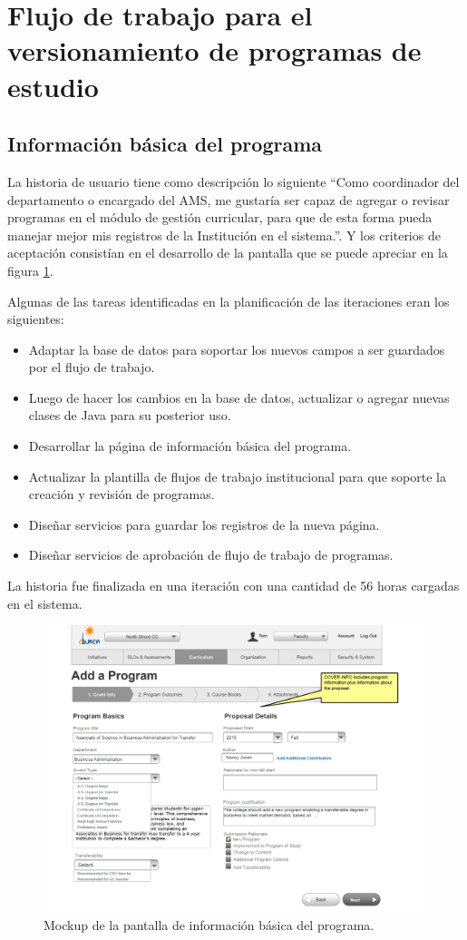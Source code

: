 \section{Flujo de trabajo para el versionamiento de programas de estudio}
\subsection{Información básica del programa}
La historia de usuario tiene como descripción lo siguiente \enquote{Como coordinador del departamento o encargado del AMS, me gustaría ser capaz de agregar o revisar programas en el módulo de gestión curricular, para que de esta forma pueda manejar mejor mis registros de la Institución en el sistema.}. Y los criterios de aceptación consistían en el desarrollo de la pantalla que se puede apreciar en la figura \ref{program_cover_info}.

Algunas de las tareas identificadas en la planificación de las iteraciones eran los siguientes:
\begin{itemize}
	\item Adaptar la base de datos para soportar los nuevos campos a ser guardados por el flujo de trabajo.
	\item Luego de hacer los cambios en la base de datos, actualizar o agregar nuevas clases de Java para su posterior uso.
	\item Desarrollar la página de información básica del programa.
	\item Actualizar la plantilla de flujos de trabajo institucional para que soporte la creación y revisión de programas.
	\item Diseñar servicios para guardar los registros de la nueva página.
	\item Diseñar servicios de aprobación de flujo de trabajo de programas.
\end{itemize}

La historia fue finalizada en una iteración con una cantidad de 56 horas cargadas en el sistema.

\begin{figure}[H]
\centering
\includegraphics[width=125mm,scale=1]{Capitulos/DesarrollodelaAplicacion/Imagenes/program_cover_info}
\caption{Mockup de la pantalla de información básica del programa.}
  \label{program_cover_info}
\end{figure}

